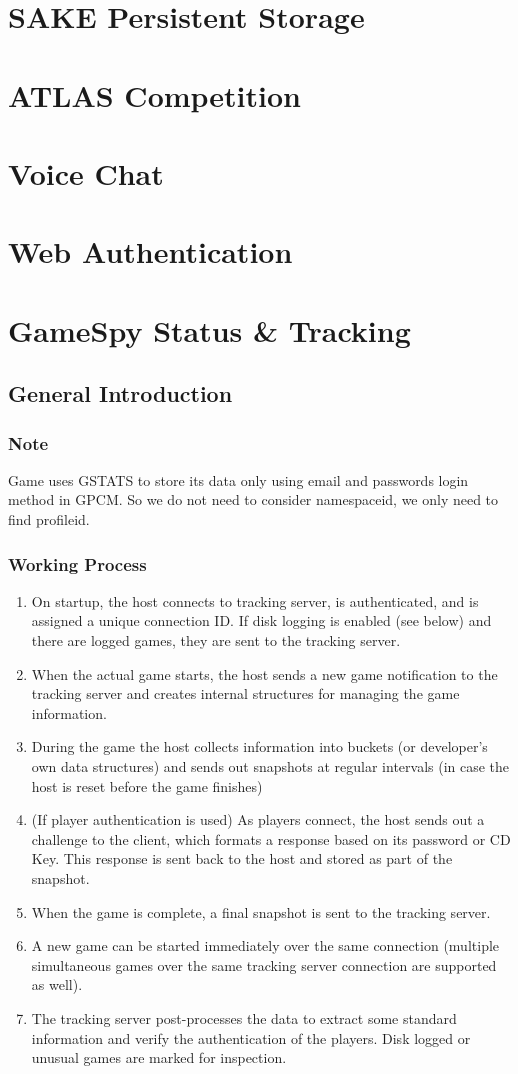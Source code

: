 \documentclass[oneside,titlepage,a4paper]{Definition/retrospy} %
\begin{document}
\part{SAKE Persistent Storage}
\part{ATLAS Competition}
\part{Voice Chat}
\part{Web Authentication}

\part{GameSpy Status \& Tracking}
\chapter{General Introduction}
\section{Note}
Game uses GSTATS to store its data only using email and passwords login method in GPCM. So we do not need to consider namespaceid, we only need to find profileid.


\section{Working Process}
\begin{enumerate}
	\item On startup, the host connects to tracking server, is authenticated, and is assigned a unique connection ID. If disk logging is enabled (see below) and there are logged games, they are sent to the tracking server. 
	\item When the actual game starts, the host sends a new game notification to the tracking server and creates internal structures for managing the game information. 
	\item During the game the host collects information into buckets (or developer's own data structures) and sends out snapshots at regular intervals (in case the host is reset before the game finishes) 
	\item (If player authentication is used) As players connect, the host sends out a challenge to the client, which formats a response based on its password or CD Key. This response is sent back to the host and stored as part of the snapshot. 
	\item When the game is complete, a final snapshot is sent to the tracking server. 
	\item A new game can be started immediately over the same connection (multiple simultaneous games over the same tracking server connection are supported as well). 
	\item The tracking server post-processes the data to extract some standard information and verify the authentication of the players. Disk logged or unusual games are marked for inspection. 
\end{enumerate}
\end{document}
